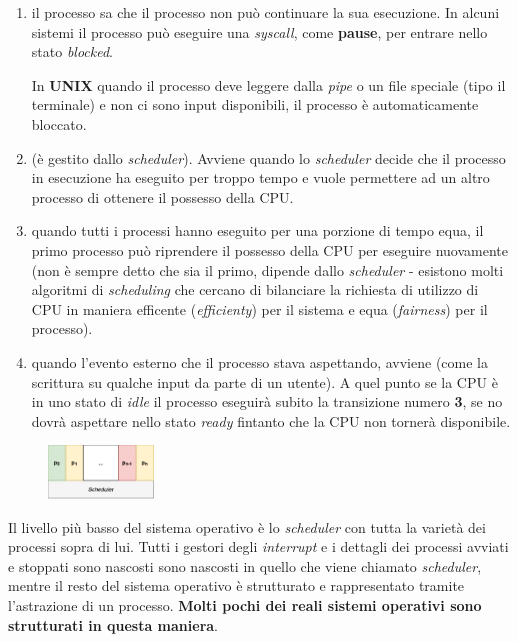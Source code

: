 \begin{enumerate}[nosep]
    \item il processo sa che il processo non può continuare la sua esecuzione. In alcuni sistemi il processo può eseguire una \textit{syscall}, come \textbf{pause}, per entrare nello stato \textit{blocked}.
    \begin{boxA}
        In \textbf{UNIX} quando il processo deve leggere dalla \textit{pipe} o un file speciale (tipo il terminale) e non ci sono input disponibili, il processo è automaticamente bloccato.
    \end{boxA}
    \item (è gestito dallo \textit{scheduler}). Avviene quando lo \textit{scheduler} decide che il processo in esecuzione ha eseguito per troppo tempo e vuole permettere ad un altro processo di ottenere il possesso della CPU.
    \item quando tutti i processi hanno eseguito per una porzione di tempo equa, il primo processo può riprendere il possesso della CPU per eseguire nuovamente (non è sempre detto che sia il primo, dipende dallo \textit{scheduler} - esistono molti algoritmi di \textit{scheduling} che cercano di bilanciare la richiesta di utilizzo di CPU in maniera efficente (\textit{efficienty}) per il sistema e equa (\textit{fairness}) per il processo).
    \item quando l'evento esterno che il processo stava aspettando, avviene (come la scrittura su qualche input da parte di un utente). A quel punto se la CPU è in uno stato di \textit{idle} il processo eseguirà subito la transizione numero \textbf{3}, se no dovrà aspettare nello stato \textit{ready} fintanto che la CPU non tornerà disponibile.
\end{enumerate}


\begin{figure}[h]
    \centering
    \includegraphics[width=0.25\textwidth]{img/ps}
\end{figure}

Il livello più basso del sistema operativo è lo \textit{scheduler} con tutta la varietà dei processi sopra di lui. Tutti i gestori degli \textit{interrupt} e i dettagli dei processi avviati e stoppati sono nascosti sono nascosti in quello che viene chiamato \textit{scheduler}, mentre il resto del sistema operativo è strutturato e rappresentato tramite l'astrazione di un processo. \textbf{Molti pochi dei reali sistemi operativi sono strutturati in questa maniera}. \\

